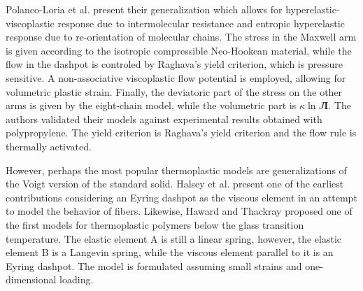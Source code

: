 Polanco-Loria et al. \citep{polanco-loriaConstitutiveModelThermoplastics2010} present their generalization which allows for hyperelastic-viscoplastic response due to intermolecular resistance and entropic hyperelastic response due to re-orientation of molecular chains.
The stress in the Maxwell arm is given according to the isotropic compressible Neo-Hookean material, while the flow in the dashpot is controled by Raghava's yield criterion, which is pressure sensitive.
A non-associative viscoplastic flow potential is employed, allowing for volumetric plastic strain.
Finally, the deviatoric part of the stress on the other arms is given by the eight-chain model, while the volumetric part is $\kappa \ln J\mathbf I$.
The authors validated their models against experimental results obtained with polypropylene.
The yield criterion is Raghava's yield criterion and the flow rule is thermally activated.

However, perhaps the most popular thermoplastic models are generalizations of the Voigt version of the standard solid.
Halsey et al. \citep{halseyMechanicalPropertiesTextiles1945} present one of the earliest contributions considering an Eyring dashpot as the viscous element in an attempt to model the behavior of fibers.
Likewise, Haward and Thackray \citep{hawardUseMathematicalModel1968} proposed one of the first models for thermoplastic polymers below the glass transition temperature.
The elastic element A is still a linear spring, however, the elastic element B is a Langevin spring, while the viscous element parallel to it is an Eyring dashpot.
The model is formulated assuming small strains and one-dimensional loading.

